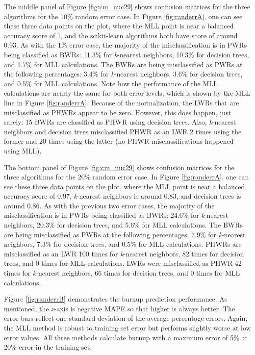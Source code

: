 The middle panel of Figure \ref{fig:cm_nuc29} shows confusion matrices for the
three algorithms for the 10\% random error case. In Figure \ref{fig:randerrA},
one can see these three data points on the plot, where the \gls{MLL} point is
near a balanced accuracy score of 1, and the scikit-learn algorithms both have
score of around 0.93. As with the 1\% error case, the majority of the
misclassification is in \gls{PWR}s being classified as \gls{BWR}s: 11.3\% for
\textit{k}-nearest neighbors, 10.3\% for decision trees, and 1.7\% for
\gls{MLL} calculations.  The \gls{BWR}s are being misclassified as \gls{PWR}s
at the following percentages: 3.4\% for \textit{k}-nearest neighbors, 3.6\% for
decision trees, and 0.5\% for \gls{MLL} calculations. Note how the performance
of the \gls{MLL} calculations are nearly the same for both error levels, which
is shown by the \gls{MLL} line in Figure \ref{fig:randerrA}. Because of the
normalization, the \gls{LWR}s that are misclassified as \gls{PHWR}s appear to
be zero. However, this does happen, just rarely: 15 \gls{BWR}s are classified
as \gls{PHWR} using decision trees. Also, \textit{k}-nearest neighbors and
decision trees misclassified \gls{PHWR} as an \gls{LWR} 2 times using the
former and 20 times using the latter (no \gls{PHWR} misclassifications happened
using \gls{MLL}).

The bottom panel of Figure \ref{fig:cm_nuc29} shows confusion matrices for the
three algorithms for the 20\% random error case. In Figure \ref{fig:randerrA},
one can see these three data points on the plot, where the \gls{MLL} point is
near a balanced accuracy score of 0.97, \textit{k}-nearest neighbors is around
0.83, and decision trees is around 0.86. As with the previous two error cases,
the majority of the misclassification is in \gls{PWR}s being classified as
\gls{BWR}s: 24.6\% for \textit{k}-nearest neighbors, 20.3\% for decision trees,
and 5.6\% for \gls{MLL} calculations.  The \gls{BWR}s are being misclassified
as \gls{PWR}s at the following percentages: 7.9\% for \textit{k}-nearest
neighbors, 7.3\% for decision trees, and 0.5\% for \gls{MLL} calculations.
\Gls{PHWR}s are misclassified as an \gls{LWR} 100 times for \textit{k}-nearest
neighbors, 82 times for decision trees, and 0 times for \gls{MLL} calculations.
\Gls{LWR}s were misclassified as \gls{PHWR} 42 times for \textit{k}-nearest
neighbors, 66 times for decision trees, and 0 times for \gls{MLL} calculations.

Figure \ref{fig:randerrB} demonstrates the burnup prediction performance.  As
mentioned, the \textit{x}-axis is negative \gls{MAPE} so that higher is always
better.  The error bars reflect one standard deviation of the average
percentage errors.  Again, the \gls{MLL} method is robust to training set error
but performs slightly worse at low error values.  All three methods calculate
burnup with a maximum error of 5\% at 20\% error in the training set.  

